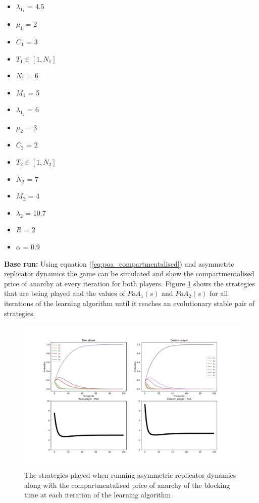 \begin{multicols}{3}
    \begin{itemize}        
        \item \( \lambda_{1_1} \) = 4.5
        \item \( \mu_1 \) = 2
        \item \( C_1 \) = 3
        \item \( T_1 \in [1, N_1] \) 
        \item \( N_1 \) = 6
        \item \( M_1 \) = 5

        \columnbreak
        \item \( \lambda_{1_2} \) = 6
        \item \( \mu_2 \) = 3
        \item \( C_2 \) = 2
        \item \( T_2 \in [1, N_2] \)
        \item \( N_2 \) = 7
        \item \( M_2 \) = 4
        
        \columnbreak
        \item \( \lambda_2 \) = 10.7
        \item \( R \) = 2
        \item \( \alpha \) = 0.9
    \end{itemize}
\end{multicols}

\textbf{Base run:}
Using equation (\ref{eq:poa_compartmentalised}) and asymmetric replicator 
dynamics the game can be simulated and show the compartmentalised price of 
anarchy at every iteration for both players.
Figure \ref{fig:ard_original} shows the strategies that are being played and 
the values of \(PoA_1(s)\) and \(PoA_2(s)\) for all iterations of the 
learning algorithm until it reaches an evolutionary stable pair of strategies.

\begin{figure}[H]
    \includegraphics[width=\textwidth]{imgs/asymmetric_rd_and_PoA/asymmetric_original.pdf}
    \caption{The strategies played when running asymmetric replicator dynamics
    along with the compartmentalised price of anarchy of the blocking time at
    each iteration of the learning algorithm}
    \label{fig:ard_original}
\end{figure}

